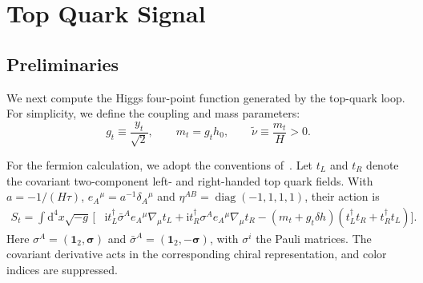 \documentclass[a4paper,12pt]{article}
\def\di{{\mathrm{d}}}
\def\ii{\mathrm{i}}
\def\tn{\tilde\nu}
\begin{document}
\section{Top Quark Signal}
\label{sec:dirac-top}

\subsection{Preliminaries}
\label{sec:dirac-action}
We next compute the Higgs four-point function generated by the top-quark loop.
For simplicity, we define the coupling and mass parameters:
\begin{equation}
 g_t\equiv\frac{y_t}{\sqrt2},\qquad m_t=g_th_0,\qquad
 \tn\equiv\frac{m_t}{H}>0.
 \label{eq:dirac-parameters}
\end{equation}

For the fermion calculation, we adopt the conventions of~\cite{aoki_fermionic_2026,you_neutrino_2026}.
Let $t_L$ and $t_R$ denote the covariant two-component left- and right-handed top quark fields.
With $a=-1/(H\tau)$, $e_A{}^\mu=a^{-1}\delta_A{}^\mu$ and $\eta^{AB}=\operatorname{diag}(-1,1,1,1)$, their action is
\begin{align}
 S_t=\int\di^4x\sqrt{-g}\,\Big[&
 \ii t_L^\dagger\bar\sigma^Ae_A{}^\mu\nabla_\mu t_L
 +\ii t_R^\dagger\sigma^Ae_A{}^\mu\nabla_\mu t_R-(m_t+g_t\delta h)
 (t_L^\dagger t_R+t_R^\dagger t_L)\Big].
 \label{eq:dirac-chiral-action}
\end{align}
Here $\sigma^A=(\mathbf1_2,\bm\sigma)$ and $\bar\sigma^A=(\mathbf1_2,-\bm\sigma)$, with $\sigma^i$ the Pauli matrices.
The covariant derivative acts in the corresponding chiral representation, and color indices are suppressed.
\end{document}
